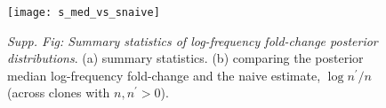 \documentclass[letterpaper,english,prl,reprint,longbibliography]{revtex4-1} %
\begin{document}
\begin{figure}[ht!]
\texttt{[image: s\_med\_vs\_snaive]}
\centering{}
\caption{
\emph{Supp. Fig: Summary statistics of log-frequency fold-change posterior distributions}. (a) summary statistics. (b) comparing the posterior median log-frequency fold-change and the naive estimate, $\log n^{\prime}/n$ (across clones with $n,n^{\prime}>0$).
\label{fig:SM_smed_snaive}}
\end{figure}


\end{document}

